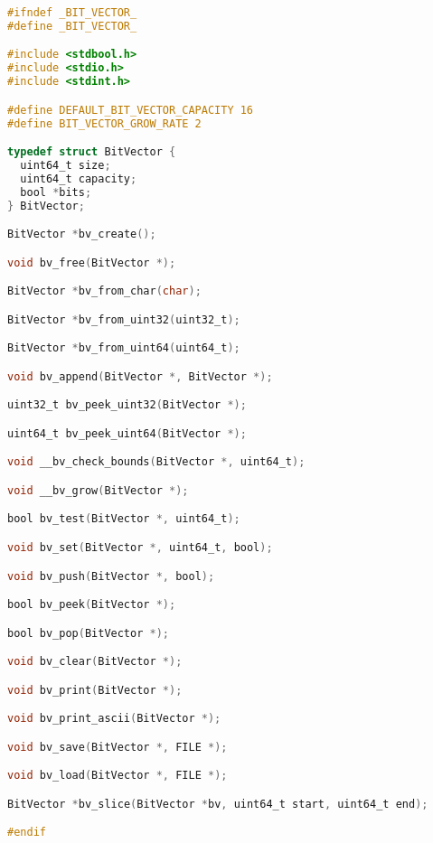 \documentclass[fancychapters]{report}   	%
\begin{document}
\begin{lstlisting}[language=C,caption={bit_vector.h}]
#ifndef _BIT_VECTOR_
#define _BIT_VECTOR_

#include <stdbool.h>
#include <stdio.h>
#include <stdint.h>

#define DEFAULT_BIT_VECTOR_CAPACITY 16
#define BIT_VECTOR_GROW_RATE 2

typedef struct BitVector {
  uint64_t size;
  uint64_t capacity;
  bool *bits;
} BitVector;

BitVector *bv_create();

void bv_free(BitVector *);

BitVector *bv_from_char(char);

BitVector *bv_from_uint32(uint32_t);

BitVector *bv_from_uint64(uint64_t);

void bv_append(BitVector *, BitVector *);

uint32_t bv_peek_uint32(BitVector *);

uint64_t bv_peek_uint64(BitVector *);

void __bv_check_bounds(BitVector *, uint64_t);

void __bv_grow(BitVector *);

bool bv_test(BitVector *, uint64_t);

void bv_set(BitVector *, uint64_t, bool);

void bv_push(BitVector *, bool);

bool bv_peek(BitVector *);

bool bv_pop(BitVector *);

void bv_clear(BitVector *);

void bv_print(BitVector *);

void bv_print_ascii(BitVector *);

void bv_save(BitVector *, FILE *);

void bv_load(BitVector *, FILE *);

BitVector *bv_slice(BitVector *bv, uint64_t start, uint64_t end);

#endif
\end{lstlisting}
\end{document}
